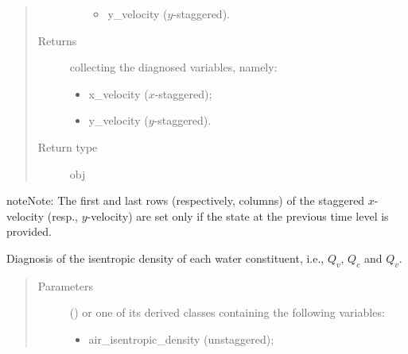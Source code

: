 \documentclass[letterpaper,10pt,english]{sphinxmanual}
\begin{document}
\begin{fulllineitems}
\begin{fulllineitems}
\begin{quote}
\begin{description}
\begin{itemize}
\begin{itemize}
\item {} 
y\_velocity (\(y\)-staggered).

\end{itemize}


\end{itemize}

\item[{Returns}] \leavevmode

{\hyperref[\detokenize{api:storages.grid_data.GridData}]{}} collecting the diagnosed variables, namely:
\begin{itemize}
\item {} 
x\_velocity (\(x\)-staggered);

\item {} 
y\_velocity (\(y\)-staggered).

\end{itemize}


\item[{Return type}] \leavevmode
obj

\end{description}\end{quote}

\begin{sphinxadmonition}{note}{Note:}
The first and last rows (respectively, columns) of the staggered \(x\)-velocity (resp., \(y\)-velocity)
are set only if the state at the previous time level is provided.
\end{sphinxadmonition}

\end{fulllineitems}


\begin{fulllineitems}
\label{\detokenize{api:dycore.diagnostic_isentropic.DiagnosticIsentropic.get_water_constituents_isentropic_density}}
Diagnosis of the isentropic density of each water constituent, i.e., \(Q_v\), \(Q_c\) and \(Q_v\).
\begin{quote}\begin{description}
\item[{Parameters}] \leavevmode
{} () \textendash{} 
{\hyperref[\detokenize{api:storages.grid_data.GridData}]{}} or one of its derived classes containing the following variables:
\begin{itemize}
\item {} 
air\_isentropic\_density (unstaggered);


\end{itemize}
\end{description}
\end{quote}
\end{fulllineitems}
\end{fulllineitems}
\end{document}
